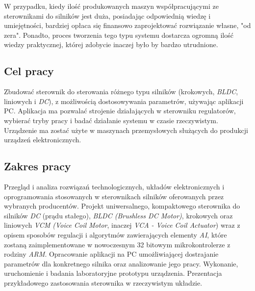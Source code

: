W przypadku, kiedy ilość produkowanych maszyn współpracującymi ze sterownikami do silników jest duża, posiadając odpowiednią wiedzę i umiejętności, bardziej opłaca się finansowo zaprojektować rozwiązanie własne, "od zera". Ponadto, proces tworzenia tego typu systemu dostarcza ogromną ilość wiedzy praktycznej, której zdobycie inaczej było by bardzo utrudnione.
  
\subsection*{Cel pracy}
Zbudować sterownik do sterowania różnego typu silników (krokowych, {\it BLDC}, liniowych i {\it DC}), z możliwością dostosowywania parametrów, używając aplikacji PC. Aplikacja ma pozwalać strojenie działających w sterowniku regulatorów, wybierać tryby pracy i badać działanie systemu w czasie rzeczywistym. Urządzenie ma zostać użyte w maszynach przemysłowych służących do produkcji urządzeń elektronicznych.

\subsection*{Zakres pracy}
Przegląd i analiza rozwiązań technologicznych, układów elektronicznych i oprogramowania stosowanych w sterownikach silników oferowanych przez wybranych producentów. Projekt uniwersalnego, kompaktowego sterownika do silników {\it DC} (prądu stałego), {\it BLDC (Brushless DC Motor)}, krokowych oraz liniowych {\it VCM (Voice Coil Motor}, inaczej {\it VCA - Voice Coil Actuator}) wraz z opisem sposobów regulacji i algorytmów zawierających elementy {\it AI}, które zostaną zaimplementowane w nowoczesnym 32 bitowym mikrokontrolerze z rodziny {\it ARM}. Opracowanie aplikacji na PC umożliwiającej dostrajanie parametrów dla konkretnego silnika oraz analizowanie jego pracy. Wykonanie, uruchomienie i badania laboratoryjne prototypu urządzenia. Prezentacja przykładowego zastosowania sterownika w rzeczywistym układzie.
